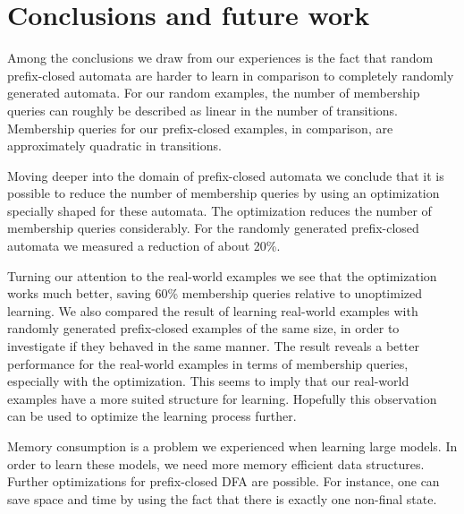 \section{Conclusions and future work}

Among the conclusions we draw from our experiences is the fact that
random prefix-closed automata are harder to learn in comparison to
completely randomly generated automata. For our random examples, the
number of membership queries can roughly be described as linear
in the number of transitions. Membership queries for our prefix-closed
examples, in comparison, are approximately quadratic in transitions.

Moving deeper into the domain of prefix-closed automata we conclude
that it is possible to reduce the number of membership queries by
using an optimization specially shaped for these automata. The
optimization reduces the number of membership queries
considerably. For the randomly generated prefix-closed automata we
measured a reduction of about 20\%.

Turning our attention to the real-world examples we see that the
optimization works much better, saving 60\% membership queries
relative to unoptimized learning. We also compared the result of
learning real-world examples with randomly generated prefix-closed
examples of the same size, in order to investigate if they behaved in
the same manner. The result reveals a better performance for the
real-world examples in terms of membership queries, especially with
the optimization. This seems to imply that our real-world examples
have a more suited structure for learning. Hopefully this observation
can be used to optimize the learning process further.

Memory consumption is a problem we experienced when learning large
models. In order to learn these models, we need more memory efficient
data structures. Further optimizations for prefix-closed DFA are
possible. For instance, one can save space and time by using the fact
that there is exactly one non-final state.

